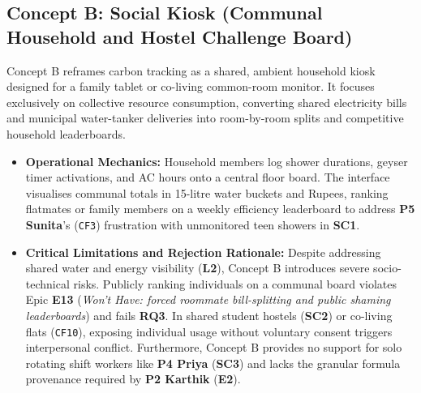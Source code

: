 \documentclass[12pt, a4paper]{article}
\begin{document}
\subsection{Concept B: Social Kiosk (Communal Household and Hostel Challenge Board)}
Concept B reframes carbon tracking as a shared, ambient household kiosk designed for a family tablet or co-living common-room monitor. It focuses exclusively on collective resource consumption, converting shared electricity bills and municipal water-tanker deliveries into room-by-room splits and competitive household leaderboards.
\begin{itemize}
    \item \textbf{Operational Mechanics:} Household members log shower durations, geyser timer activations, and AC hours onto a central floor board. The interface visualises communal totals in 15-litre water buckets and Rupees, ranking flatmates or family members on a weekly efficiency leaderboard to address \textbf{P5 Sunita}'s (\texttt{CF3}) frustration with unmonitored teen showers in \textbf{SC1}.
    \item \textbf{Critical Limitations and Rejection Rationale:} Despite addressing shared water and energy visibility (\textbf{L2}), Concept B introduces severe socio-technical risks. Publicly ranking individuals on a communal board violates Epic \textbf{E13} (\textit{Won't Have: forced roommate bill-splitting and public shaming leaderboards}) and fails \textbf{RQ3}. In shared student hostels (\textbf{SC2}) or co-living flats (\texttt{CF10}), exposing individual usage without voluntary consent triggers interpersonal conflict. Furthermore, Concept B provides no support for solo rotating shift workers like \textbf{P4 Priya} (\textbf{SC3}) and lacks the granular formula provenance required by \textbf{P2 Karthik} (\textbf{E2}).
\end{itemize}
\end{document}
